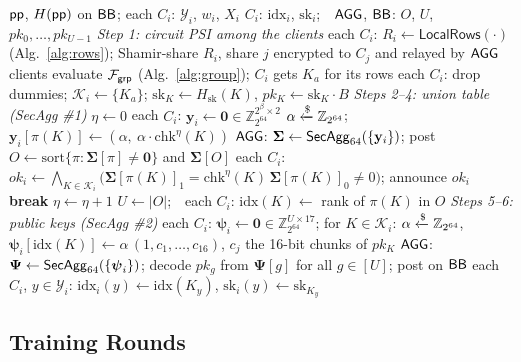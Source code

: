 \begin{algorithm}[t]
\caption{Setup: private label union and keys (Fig.~\ref{fig:setup})}
\label{alg:setup}
\begin{algorithmic}[1]
\Require $\mathsf{pp}$, $H(\mathsf{pp})$ on $\mathsf{BB}$; each $C_i$: $\mathcal{Y}_i$, $w_i$, $X_i$
\Ensure $C_i$: $\mathrm{idx}_i$, $\mathrm{sk}_i$;\ \ $\mathsf{AGG}$, $\mathsf{BB}$: $O$, $U$, $pk_0,\dots,pk_{U-1}$
\Statex \textit{Step 1: circuit PSI among the clients}
\State each $C_i$: $R_i\gets\mathsf{LocalRows}(\cdot)$ (Alg.~\ref{alg:rows}); Shamir-share $R_i$, share $j$ encrypted to $C_j$ and relayed by $\mathsf{AGG}$
\State clients evaluate $\mathcal{F}_{\mathsf{grp}}$ (Alg.~\ref{alg:group}); $C_i$ gets $K_a$ for its rows
\State each $C_i$: drop dummies; $\mathcal{K}_i\gets\{K_a\}$; $\mathrm{sk}_K\gets H_{\mathrm{sk}}(K)$, $pk_K\gets\mathrm{sk}_K\cdot B$
\Statex \textit{Steps 2--4: union table (SecAgg \#1)}
\State $\eta\gets0$
\Loop
  \State each $C_i$: $\mathbf{y}_i\gets\mathbf{0}\in\mathbb{Z}_{2^{64}}^{2^{\beta}\times2}$
   
    \State $\alpha\xleftarrow{\$}\mathbb{Z}_{2^{64}}$;\ \ $\mathbf{y}_i[\pi(K)]\gets(\alpha,\ \alpha\cdot\mathrm{chk}^{\eta}(K))$
  \EndFor
  \State $\mathsf{AGG}$: $\boldsymbol{\Sigma}\gets\mathsf{SecAgg}_{64}(\{\mathbf{y}_i\})$; post $O\gets\mathrm{sort}\{\pi:\boldsymbol{\Sigma}[\pi]\neq\mathbf{0}\}$ and $\boldsymbol{\Sigma}[O]$
  \State each $C_i$: $\mathit{ok}_i\gets\bigwedge_{K\in\mathcal{K}_i}\big(\boldsymbol{\Sigma}[\pi(K)]_1=\mathrm{chk}^{\eta}(K)\,\boldsymbol{\Sigma}[\pi(K)]_0\neq0\big)$; announce $\mathit{ok}_i$
   \textbf{break} \EndIf
  \State $\eta\gets\eta+1$ 
\EndLoop
\State $U\gets|O|$;\ \ each $C_i$: $\mathrm{idx}(K)\gets$ rank of $\pi(K)$ in $O$
\Statex \textit{Steps 5--6: public keys (SecAgg \#2)}
\State each $C_i$: $\boldsymbol{\psi}_i\gets\mathbf{0}\in\mathbb{Z}_{2^{64}}^{U\times17}$; for $K\in\mathcal{K}_i$: $\alpha\xleftarrow{\$}\mathbb{Z}_{2^{64}}$, $\boldsymbol{\psi}_i[\mathrm{idx}(K)]\gets\alpha\,(1,c_1,\dots,c_{16})$, $c_j$ the 16-bit chunks of $pk_K$
\State $\mathsf{AGG}$: $\boldsymbol{\Psi}\gets\mathsf{SecAgg}_{64}(\{\boldsymbol{\psi}_i\})$; decode $pk_g$ from $\boldsymbol{\Psi}[g]$ for all $g\in[U]$; post on $\mathsf{BB}$
\State each $C_i$, $y\in\mathcal{Y}_i$: $\mathrm{idx}_i(y)\gets\mathrm{idx}(K_y)$, $\mathrm{sk}_i(y)\gets\mathrm{sk}_{K_y}$
\end{algorithmic}
\end{algorithm}

\subsection{Training Rounds}
\label{sec:rounds}

